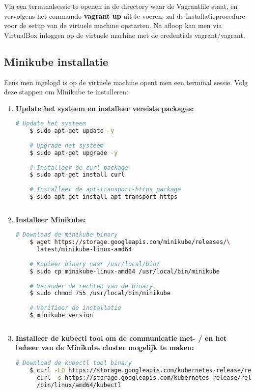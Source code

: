 Via een terminalsessie te openen in de directory waar de Vagrantfile staat, en vervolgens het commando {\bf vagrant up} uit te voeren, zal de installatieprocedure voor de setup van de virtuele machine opstarten. Na afloop kan men via VirtualBox inloggen op de virtuele machine met de credentials vagrant/vagrant. 


\subsection{Minikube installatie}

Eens men ingelogd is op de virtuele machine opent men een terminal sessie. 
Volg deze stappen om Minikube te installeren: \autocite{Simic2020}
\begin{enumerate}
    \item {\bf Update het systeem en installeer vereiste packages:}
    \begin{lstlisting}[language=bash]
    # Update het systeem
    $ sudo apt-get update -y
    
    # Upgrade het systeem
    $ sudo apt-get upgrade -y
    
    # Installeer de curl package
    $ sudo apt-get install curl
    
    # Installeer de apt-transport-https package
    $ sudo apt-get install apt-transport-https
    
    \end{lstlisting}

    \item {\bf Installeer Minikube:}
    \begin{lstlisting}[language=bash]
    # Download de minikube binary
    $ wget https://storage.googleapis.com/minikube/releases/\
      latest/minikube-linux-amd64
    
    # Kopieer binary naar /usr/local/bin/
    $ sudo cp minikube-linux-amd64 /usr/local/bin/minikube
    
    # Verander de rechten van de binary 
    $ sudo chmod 755 /usr/local/bin/minikube
    
    # Verifieer de installatie
    $ minikube version
    
    \end{lstlisting}

    \item {\bf Installeer de kubectl tool om de communicatie met- / en het beheer van de Minikube cluster mogelijk te maken:}
    \begin{lstlisting}[language=bash]
    # Download de kubectl tool binary
    $ curl -LO https://storage.googleapis.com/kubernetes-release/release/`\
      curl -s https://storage.googleapis.com/kubernetes-release/release/stable.txt`\
      /bin/linux/amd64/kubectl
    

\end{lstlisting}
\end{enumerate}
